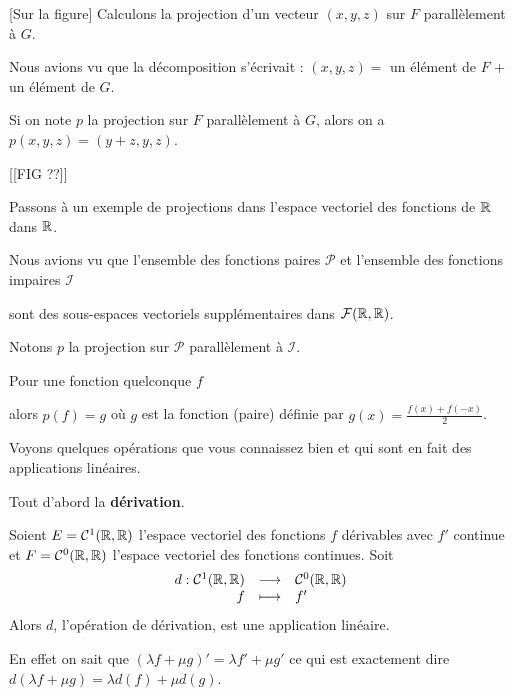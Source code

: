 [Sur la figure]
Calculons la projection d'un vecteur $(x,y,z)$ sur $F$ parallèlement à $G$.

\change

Nous avions vu que la décomposition s'écrivait :
$(x,y,z)=$ un élément de $F$ + un élément de $G$.

\change


Si on note $p$ la projection sur $F$ parallèlement à $G$, alors  
on a $p(x,y,z)=(y+z,y,z)$. 

[[FIG ??]]


\diapo

Passons à un exemple de projections dans l'espace vectoriel des fonctions de $\mathbb{R}$ dans $\mathbb{R}$.

Nous avions vu  que l'ensemble des fonctions paires $\mathcal{P}$ et l'ensemble des fonctions 
impaires $\mathcal{I}$ 
 
\change
 
sont des sous-espaces vectoriels supplémentaires dans $\mathcal{F}(\mathbb{R} ,\mathbb{R})$.

\change

Notons $p$ la projection sur $\mathcal{P}$ parallèlement à $\mathcal{I}$. 

\change

Pour une fonction quelconque $f$ 

alors $p(f)=g$ où $g$ est la fonction (paire) définie par $g(x)=\frac{f(x)+f(-x)}{2}$.



\diapo

Voyons quelques opérations que vous connaissez bien et qui sont en fait des applications linéaires.

Tout d'abord la \textbf{dérivation}.

Soient $E  = \mathcal{C}^1 (\mathbb{R},\mathbb{R})$ l'espace vectoriel des fonctions 
$f$ dérivables avec $f'$ continue et 
$F = \mathcal{C}^0 (\mathbb{R},\mathbb{R})$ l'espace vectoriel des fonctions continues.
Soit 
$$\begin{array}{rcl}
d : \mathcal{C}^1 (\mathbb{R},\mathbb{R}) & \longrightarrow & \mathcal{C}^0 (\mathbb{R},\mathbb{R})  \\
f & \longmapsto & f'     
  \end{array}$$
Alors $d$, l'opération de dérivation, est une application linéaire.


En effet on sait que $(\lambda f + \mu g)' = \lambda f' + \mu g'$ ce qui est exactement dire
$d(\lambda f + \mu g)=\lambda d(f) + \mu d(g)$.

